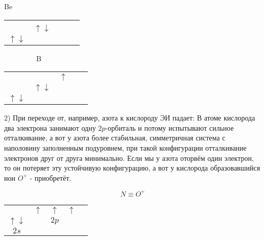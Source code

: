 \begin{center}
Be \begin{tabular}[c]{ccccc}
	\cline{3-5}
	& \multicolumn{1}{c|}{} & \multicolumn{1}{c|}{} & \multicolumn{1}{c|}{} & \multicolumn{1}{c|}{} \\ \cline{2-5} 
	\multicolumn{1}{c|}{}  & \multicolumn{1}{c|}{$\uparrow\downarrow$} &                       &                       &                       \\ \cline{1-2}
	\multicolumn{1}{|c|}{$\uparrow\downarrow$ }                        \\ \cline{1-1}
\end{tabular}   $\;\;\;\;\;\;\;\;\;\;\;\;\;\;\;$      B \begin{tabular}[c]{ccccc}
	\cline{3-5}
	& \multicolumn{1}{c|}{} & \multicolumn{1}{c|}{$\uparrow$} & \multicolumn{1}{c|}{} & \multicolumn{1}{c|}{} \\ \cline{2-5} 
	\multicolumn{1}{c|}{}  & \multicolumn{1}{c|}{$\uparrow\downarrow$} &                       &                       &                       \\ \cline{1-2}
	\multicolumn{1}{|c|}{$\uparrow\downarrow$}                      \\ \cline{1-1}
\end{tabular}
\end{center}	

2) При переходе от, например, азота к кислороду ЭИ падает:
В атоме кислорода два электрона занимают одну $2p$-орбиталь и
потому испытывают сильное отталкивание, а вот у азота более
стабильная, симметричная система с наполовину заполненным
подуровнем, при такой конфигурации отталкивание электронов
друг от друга минимально. Если мы у азота оторвём один
электрон, то он потеряет эту устойчивую конфигурацию, а вот у
кислорода образовавшийся ион $O^+$ - приобретёт.
	
	
$$N\equiv O^+$$

\begin{center}
\begin{tabular}[c]{ccccc}
	\cline{2-4}
	\multicolumn{1}{c|}{}  & \multicolumn{1}{c|}{$\uparrow$} & \multicolumn{1}{c|}{$\uparrow$} & \multicolumn{1}{c|}{$\uparrow$} &  \\ \cline{1-4}
	\multicolumn{1}{|c|}{$\uparrow\downarrow$} &                       & $2p$                    &                       &  \\ \cline{1-1}
	$2s$                    
\end{tabular}
\end{center}
	
